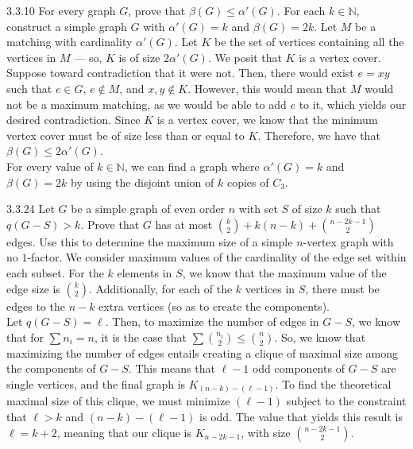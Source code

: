 \documentclass[9pt]{extarticle}
\title{}
\author{Avinash Iyer}
\date{}
\begin{document}
{
  \begin{problem}{3.3.10}
    For every graph $G$, prove that $\beta(G) \leq \alpha'(G)$. For each $k\in \mathbb{N}$, construct a simple graph $G$ with $\alpha'(G) = k$ and $\beta(G) = 2k$.
    \tcblower
    Let $M$ be a matching with cardinality $\alpha'(G)$. Let $K$ be the set of vertices containing all the vertices in $M$ --- so, $K$ is of size $2\alpha'(G)$. We posit that $K$ is a vertex cover. Suppose toward contradiction that it were not. Then, there would exist $e=xy$ such that $e\in G$, $e\notin M$, and $x,y\notin K$. However, this would mean that $M$ would not be a maximum matching, as we would be able to add $e$ to it, which yields our desired contradiction. Since $K$ is a vertex cover, we know that the minimum vertex cover must be of size less than or equal to $K$. Therefore, we have that $\beta(G) \leq 2\alpha'(G)$.\\

    For every value of $k\in \mathbb{N}$, we can find a graph where $\alpha'(G) = k$ and $\beta(G) = 2k$ by using the disjoint union of $k$ copies of $C_3$.
  \end{problem}
  \begin{problem}{3.3.24}
    Let $G$ be a simple graph of even order $n$ with set $S$ of size $k$ such that $q(G-S) > k$. Prove that $G$ has at most ${k\choose 2} + k(n-k) + {n-2k-1 \choose 2}$ edges. Use this to determine the maximum size of a simple $n$-vertex graph with no $1$-factor.
    \tcblower
    We consider maximum values of the cardinality of the edge set within each subset. For the $k$ elements in $S$, we know that the maximum value of the edge size is ${k\choose 2}$. Additionally, for each of the $k$ vertices in $S$, there must be edges to the $n-k$ extra vertices (so as to create the components).\\

    Let $q(G-S) = \ell$. Then, to maximize the number of edges in $G-S$, we know that for $\sum n_i = n$, it is the case that $\sum {n_i\choose 2} \leq {n\choose 2}$. So, we know that maximizing the number of edges entails creating a clique of maximal size among the components of $G-S$. This means that $\ell-1$ odd components of $G-S$ are single vertices, and the final graph is $K_{(n-k)-(\ell-1)}$. To find the theoretical maximal size of this clique, we must minimize $(\ell-1)$ subject to the constraint that $\ell > k$ and $(n-k)-(\ell-1)$ is odd. The value that yields this result is $\ell = k+ 2$, meaning that our clique is $K_{n-2k-1}$, with size ${n-2k-1 \choose 2}$.\\


\end{problem}}
\end{document}
